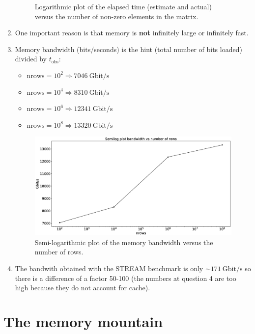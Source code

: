 \documentclass[a4paper]{article}
\begin{document}
\begin{enumerate}
\begin{figure}[ht!]
        \captionsetup{width=.9\linewidth}
        \caption{Logarithmic plot of the elapsed time (estimate and actual) versus the number of non-zero elements in the matrix.}
        \label{nnz_vs_time}
    \end{figure}
    \item One important reason is that memory is \textbf{not} infinitely large or infinitely fast.
    \item Memory bandwidth (bits/seconds) is the hint (total number of bits loaded) divided by $t_\text{obs}$:
    \begin{itemize}
        \setlength\itemsep{0.01em}
        \item $\text{nrows} = 10^2 \Rightarrow 7046 \ \text{Gbit/s}$
        \item $\text{nrows} = 10^4 \Rightarrow 8310 \ \text{Gbit/s}$
        \item $\text{nrows} = 10^6 \Rightarrow 12341 \ \text{Gbit/s}$
        \item $\text{nrows} = 10^8 \Rightarrow 13320 \ \text{Gbit/s}$
    \end{itemize}
    \begin{figure}[ht!]
        \centering
        \includegraphics[scale=0.25]{nrows_band.eps}
        \captionsetup{width=.9\linewidth}
        \caption{Semi-logarithmic plot of the memory bandwidth versus the number of rows.}
        \label{nnz_vs_time}
    \end{figure}
    \item The bandwith obtained with the STREAM benchmark is only $\sim171 \ \text{Gbit/s}$ so there is a difference of a factor 50-100 (the numbers at question 4 are too high because they do not account for cache).
\end{enumerate}

\section{The memory mountain}
\end{document}
